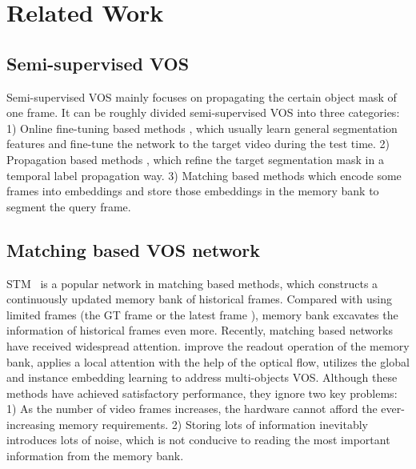 \documentclass[10pt,twocolumn,letterpaper]{article}
\begin{document}
\section{Related Work \label{sec:related}}
\subsection{Semi-supervised VOS}
Semi-supervised VOS mainly focuses on propagating the certain object mask of one frame. It can be roughly divided semi-supervised VOS into three categories: 1) Online fine-tuning based methods \cite{xiao2018monet, maninis2018video}, which usually learn general segmentation features and fine-tune the network to the target video during the test time. 2) Propagation based methods \cite{luiten2018premvos, chen2020state}, which refine the target segmentation mask in a temporal label propagation way. 3) Matching based methods \cite{oh2019video, seong2020kernelized, zhang2020transductive, cheng2021rethinking, mao2021joint} which encode some frames into embeddings and store those embeddings in the memory bank to segment the query frame. 
\subsection{Matching based VOS network}
STM~\cite{oh2019video} is a popular network in matching based methods, which constructs a continuously updated memory bank of historical frames. Compared with using limited frames (the GT frame \cite{hu2018videomatch} or the latest frame \cite{perazzi2017learning}), memory bank excavates the information of historical frames even more. Recently, matching based networks have received widespread attention. \cite{seong2020kernelized, lu2020video, cheng2021modular, hu2021learning} improve the readout operation of the memory bank, \cite{xie2021efficient} applies a local attention with the help of the optical flow, \cite{ge2021video} utilizes the global and instance embedding learning to address multi-objects VOS. Although these methods have achieved satisfactory performance, they ignore two key problems: 1) As the number of video frames increases, the hardware cannot afford the ever-increasing memory requirements. 2) Storing lots of information inevitably introduces lots of noise, which is not conducive to reading the most important information from the memory bank.
\end{document}
